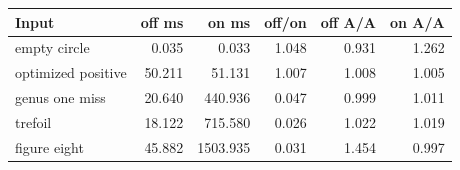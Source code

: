 \begin{center}
\small
\begin{tabular}{lrrrrr}
\toprule
Input & off ms & on ms & off/on & off A/A & on A/A\\
\midrule
empty circle & 0.035 & 0.033 & 1.048 & 0.931 & 1.262\\
optimized positive & 50.211 & 51.131 & 1.007 & 1.008 & 1.005\\
genus one miss & 20.640 & 440.936 & 0.047 & 0.999 & 1.011\\
trefoil & 18.122 & 715.580 & 0.026 & 1.022 & 1.019\\
figure eight & 45.882 & 1503.935 & 0.031 & 1.454 & 0.997\\
\bottomrule
\end{tabular}
\end{center}
